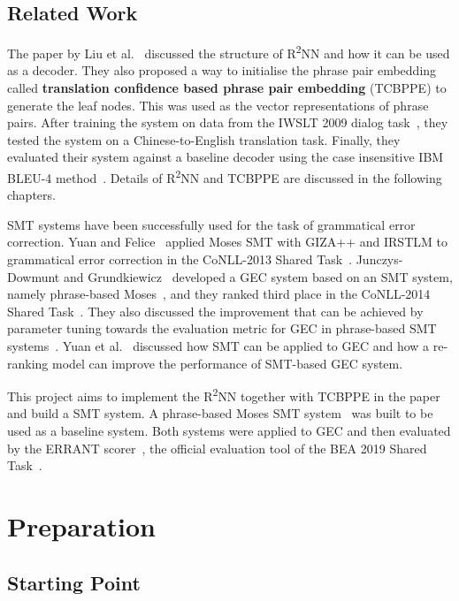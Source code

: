 \documentclass[12pt,a4paper,twoside]{report}
\begin{document}
\section{Related Work}
The paper by Liu et al.~\cite{r2nn} discussed the structure of R\textsuperscript{2}NN and how it can be used as a decoder. They also proposed a way to initialise the phrase pair embedding called \textbf{translation confidence based phrase pair embedding} (TCBPPE) to generate the leaf nodes. This was used as the vector representations of phrase pairs. After training the system on data from the IWSLT 2009 dialog task~\cite{paul-2009-overview}, they tested the system on a Chinese-to-English translation task. Finally, they evaluated their system against a baseline decoder using the case insensitive IBM BLEU-4 method~\cite{10.3115/1073083.1073135}. Details of R\textsuperscript{2}NN and TCBPPE are discussed in the following chapters.

SMT systems have been successfully used for the task of grammatical error correction. Yuan and Felice~\cite{yuan-felice-2013-constrained} applied Moses SMT with GIZA++ and IRSTLM to grammatical error correction in the CoNLL-2013 Shared Task~\cite{ng-etal-2013-conll}. Junczys-Dowmunt and Grundkiewicz~\cite{junczys-dowmunt-grundkiewicz-2014-amu} developed a GEC system based on an SMT system, namely phrase-based Moses~\cite{moses}, and they ranked third place in the CoNLL-2014 Shared Task~\cite{ng-etal-2014-conll}. They also discussed the improvement that can be achieved by parameter tuning towards the evaluation metric for GEC in phrase-based SMT systems~\cite{junczys-dowmunt-grundkiewicz-2016-phrase}. Yuan et al.~\cite{yuan-etal-2016-candidate} discussed how SMT can be applied to GEC and how a re-ranking model can improve the performance of SMT-based GEC system.

This project aims to implement the R\textsuperscript{2}NN together with TCBPPE in the paper~\cite{r2nn} and build a SMT system. A phrase-based Moses SMT system~\cite{moses} was built to be used as a baseline system. Both systems were applied to GEC and then evaluated by the ERRANT scorer~\cite{bryant-etal-2017-automatic, felice-etal-2016-automatic}, the official evaluation tool of the BEA 2019 Shared Task~\cite{bryant-etal-2019-bea}.


\chapter{Preparation}

\section{Starting Point}\label{section:start}
\end{document}
